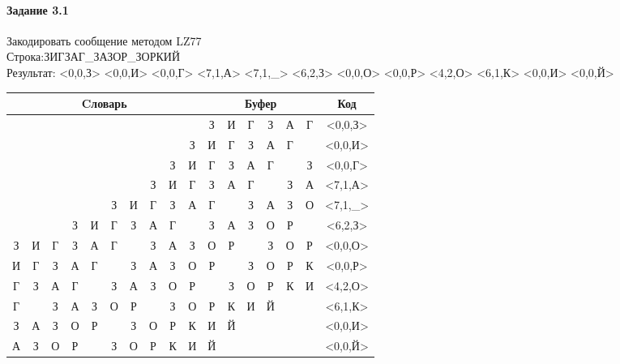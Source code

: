 \documentclass[a4paper, 12pt]{article}
\begin{document}
\paragraph{Задание 3.1}

Закодировать сообщение методом LZ77\\
Строка:ЗИГЗАГ\_ЗАЗОР\_ЗОРКИЙ\\
Результат: <0,0,З> <0,0,И> <0,0,Г> <7,1,А> <7,1,\_> <6,2,З> <0,0,О> <0,0,Р> <4,2,О> <6,1,К> <0,0,И> <0,0,Й>\\
\begin{table}[h!]
\centering
\begin{tabular}{|c|c|c|c|c|c|c|c|c|c|c|c|c|c|c|c|c|} 
\hline
\multicolumn{10}{|c|}{Cловарь} & \multicolumn{6}{c|}{Буфер} & Код  \\ \hline
  &   &   &   &   &   &   &   &   &   & \cellcolor[HTML]{8CE4F6} З & И & Г & З & А & Г & <0,0,З>
\\ \hline
  &   &   &   &   &   &   &   &   & З & \cellcolor[HTML]{8CE4F6} И & Г & З & А & Г &   & <0,0,И>
\\ \hline
  &   &   &   &   &   &   &   & З & И & \cellcolor[HTML]{8CE4F6} Г & З & А & Г &   & З & <0,0,Г>
\\ \hline
  &   &   &   &   &   &   & \cellcolor[HTML]{FFFF00} З & И & Г & \cellcolor[HTML]{FFFF00} З & \cellcolor[HTML]{8CE4F6} А & Г &   & З & А & <7,1,А>
\\ \hline
  &   &   &   &   & З & И & \cellcolor[HTML]{FFFF00} Г & З & А & \cellcolor[HTML]{FFFF00} Г & \cellcolor[HTML]{8CE4F6}   & З & А & З & О & <7,1,\_>
\\ \hline
  &   &   & З & И & Г & \cellcolor[HTML]{FFFF00} З & \cellcolor[HTML]{FFFF00} А & Г &   & \cellcolor[HTML]{FFFF00} З & \cellcolor[HTML]{FFFF00} А & \cellcolor[HTML]{8CE4F6} З & О & Р &   & <6,2,З>
\\ \hline
З & И & Г & З & А & Г &   & З & А & З & \cellcolor[HTML]{8CE4F6} О & Р &   & З & О & Р & <0,0,О>
\\ \hline
И & Г & З & А & Г &   & З & А & З & О & \cellcolor[HTML]{8CE4F6} Р &   & З & О & Р & К & <0,0,Р>
\\ \hline
Г & З & А & Г & \cellcolor[HTML]{FFFF00}   & \cellcolor[HTML]{FFFF00} З & А & З & О & Р & \cellcolor[HTML]{FFFF00}   & \cellcolor[HTML]{FFFF00} З & \cellcolor[HTML]{8CE4F6} О & Р & К & И & <4,2,О>
\\ \hline
Г &   & З & А & З & О & \cellcolor[HTML]{FFFF00} Р &   & З & О & \cellcolor[HTML]{FFFF00} Р & \cellcolor[HTML]{8CE4F6} К & И & Й &   &   & <6,1,К>
\\ \hline
З & А & З & О & Р &   & З & О & Р & К & \cellcolor[HTML]{8CE4F6} И & Й &   &   &   &   & <0,0,И>
\\ \hline
А & З & О & Р &   & З & О & Р & К & И & \cellcolor[HTML]{8CE4F6} Й &   &   &   &   &   & <0,0,Й>
\\ \hline
\end{tabular}
\end{table}
\end{document}
